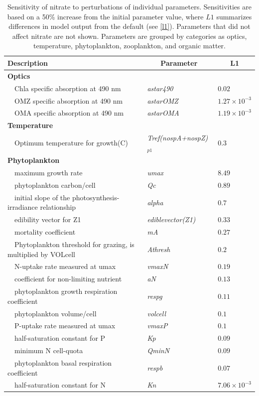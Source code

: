 \documentclass[preprint]{elsarticle}\usepackage[]{graphicx}\usepackage[]{color}
\begin{document}
\begin{table}[!tbp]
{\footnotesize
\caption{Sensitivity of nitrate to perturbations of individual parameters.  Sensitivities are based on a 50\% increase from the initial parameter value, where $L1$ summarizes differences in model output from the default (see \cref{l1}).  Parameters that did not affect nitrate are not shown.  Parameters are grouped by categories as optics, temperature, phytoplankton, zooplankton, and organic matter.\label{tab:no3sens}} 
\begin{center}
\begin{tabular}{lll}
\hline\hline
\multicolumn{1}{l}{Description}&\multicolumn{1}{c}{Parameter}&\multicolumn{1}{c}{L1}\tabularnewline
\hline
{\bfseries Optics}&&\tabularnewline
~~Chla specific absorption at 490 nm&\textit{astar490}&$0.02$\tabularnewline
~~OMZ specific absorption at 490 nm&\textit{astarOMZ}&$1.27\times 10^{-3}$\tabularnewline
~~OMA specific absorption at 490 nm&\textit{astarOMA}&$1.19\times 10^{-3}$\tabularnewline
\hline
{\bfseries Temperature}&&\tabularnewline
~~Optimum temperature for growth(C)&\textit{Tref(nospA+nospZ)$_{p1}$}&$0.3$\tabularnewline
\hline
{\bfseries Phytoplankton}&&\tabularnewline
~~maximum growth rate&\textit{umax}&$8.49$\tabularnewline
~~phytoplankton carbon/cell&\textit{Qc}&$0.89$\tabularnewline
~~initial slope of the photosynthesis-irradiance relationship&\textit{alpha}&$0.7$\tabularnewline
~~edibility vector for Z1&\textit{ediblevector(Z1)}&$0.33$\tabularnewline
~~mortality coefficient&\textit{mA}&$0.27$\tabularnewline
~~Phytoplankton threshold for grazing, is multiplied by VOLcell&\textit{Athresh}&$0.2$\tabularnewline
~~N-uptake rate measured at umax&\textit{vmaxN}&$0.19$\tabularnewline
~~coefficient for non-limiting nutrient&\textit{aN}&$0.13$\tabularnewline
~~phytoplankton growth respiration coefficient&\textit{respg}&$0.11$\tabularnewline
~~phytoplankton volume/cell&\textit{volcell}&$0.1$\tabularnewline
~~P-uptake rate measured at umax&\textit{vmaxP}&$0.1$\tabularnewline
~~half-saturation constant for P&\textit{Kp}&$0.09$\tabularnewline
~~minimum N cell-quota&\textit{QminN}&$0.09$\tabularnewline
~~phytoplankton basal respiration coefficient&\textit{respb}&$0.07$\tabularnewline
~~half-saturation constant for N&\textit{Kn}&$7.06\times 10^{-3}$\tabularnewline

\end{tabular}
\end{center}}
\end{table}
\end{document}
